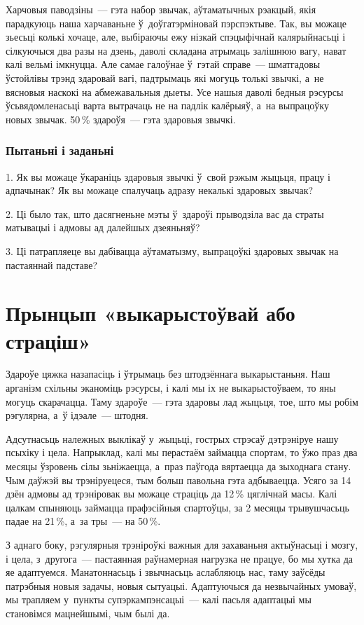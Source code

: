 Харчовыя паводзіны~--- гэта набор звычак, аўтаматычных рэакцый, якія парадкуюць наша харчаваньне ў~доўгатэрміновай пэрспэктыве. Так, вы можаце зьесьці колькі хочаце, але, выбіраючы ежу нізкай спэцыфічнай калярыйнасьці і сілкуючыся два разы на дзень, даволі складана атрымаць залішнюю вагу, нават калі вельмі імкнуцца. Але самае галоўнае ў~гэтай справе~--- шматгадовы ўстойлівы трэнд здаровай вагі, падтрымаць які могуць толькі звычкі, а~не вясновыя наскокі на абмежавальныя дыеты. Усе нашыя даволі бедныя рэсурсы ўсьвядомленасьці варта вытрачаць не на падлік калёрыяў, а~на выпрацоўку новых звычак. 50\,\% здароўя~--- гэта здаровыя звычкі.

\subsubsection{Пытаньні і заданьні}

1. Як вы можаце ўкараніць здаровыя звычкі ў~свой рэжым жыцьця, працу і адпачынак? Як вы можаце спалучаць адразу некалькі здаровых звычак?

2. Ці было так, што дасягненьне мэты ў~здароўі прыводзіла вас да страты матывацыі і адмовы ад далейшых дзеяньняў?

3. Ці патрапляеце вы дабівацца аўтаматызму, выпрацоўкі здаровых звычак на пастаяннай падставе?


\section{Прынцып «выкарыстоўвай або страціш»}

Здароўе цяжка назапасіць і ўтрымаць без штодзённага выкарыстаньня. Наш арганізм схільны эканоміць рэсурсы, і калі мы іх не выкарыстоўваем, то яны могуць скарачацца. Таму здароўе~--- гэта здаровы лад жыцьця, тое, што мы робім рэгулярна, а~ў ідэале~--- штодня.

Адсутнасьць належных выклікаў у~жыцьці, гострых стрэсаў дэтрэніруе нашу псыхіку і цела. Напрыклад, калі мы перастаём займацца спортам, то ўжо праз два месяцы ўзровень сілы зьніжаецца, а~праз паўгода вяртаецца да зыходнага стану. Чым даўжэй вы трэніруецеся, тым больш павольна гэта адбываецца. Усяго за 14 дзён адмовы ад трэніровак вы можаце страціць да 12\,\% цяглічнай масы. Калі цалкам спыняюць займацца прафэсійныя спартоўцы, за 2 месяцы трывушчасьць падае на 21\,\%, а~за тры~--- на 50\,\%.

З аднаго боку, рэгулярныя трэніроўкі важныя для захаваньня актыўнасьці і мозгу, і цела, з~другога~--- пастаянная раўнамерная нагрузка не працуе, бо мы хутка да яе адаптуемся. Манатоннасьць і звычнасьць аслабляюць нас, таму заўсёды патрэбныя новыя задачы, новыя сытуацыі. Адаптуючыся да незвычайных умоваў, мы трапляем у~пункты супэркампэнсацыі~--- калі пасьля адаптацыі мы становімся мацнейшымі, чым былі да.

